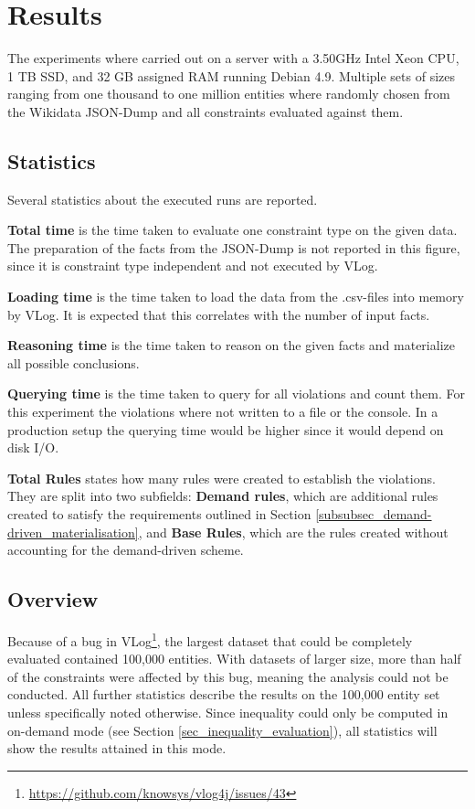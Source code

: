 \documentclass[hyperref,bachelorofscience,fleqn]{cgvpub}
\begin{document}
\section{Results}\label{sec_results}

The experiments where carried out on a server with a 3.50GHz Intel Xeon CPU, 1 TB SSD, and 32 GB assigned RAM running Debian 4.9. Multiple sets of sizes ranging from one thousand to one million entities where randomly chosen from the Wikidata JSON-Dump and all constraints evaluated against them.

\subsection{Statistics}
Several statistics about the executed runs are reported.

{\bf Total time} is the time taken to evaluate one constraint type on the given data. The preparation of the facts from the JSON-Dump is not reported in this figure, since it is constraint type independent and not executed by VLog.

{\bf Loading time} is the time taken to load the data from the .csv-files into memory by VLog. It is expected that this correlates with the number of input facts.

{\bf Reasoning time}  is the time taken to reason on the given facts and materialize all possible conclusions.

{\bf Querying time} is the time taken to query for all violations and count them. For this experiment the violations where not written to a file or the console. In a production setup the querying time would be higher since it would depend on disk I/O.

{\bf Total Rules} states how many rules were created to establish the violations. They are split into two subfields: {\bf Demand rules}, which are additional rules created to satisfy the requirements outlined in Section \ref{subsubsec_demand-driven_materialisation}, and {\bf Base Rules}, which are the rules created without accounting for the demand-driven scheme.

\subsection{Overview}

Because of a bug in VLog\footnote{\url{https://github.com/knowsys/vlog4j/issues/43}}, the largest dataset that could be completely evaluated contained 100,000 entities. With datasets of larger size, more than half of the constraints were affected by this bug, meaning the analysis could not be conducted. All further statistics describe the results on the 100,000 entity set unless specifically noted otherwise. Since inequality could only be computed in on-demand mode (see Section  \ref{sec_inequality_evaluation}), all statistics will show the results attained in this mode.
\end{document}
